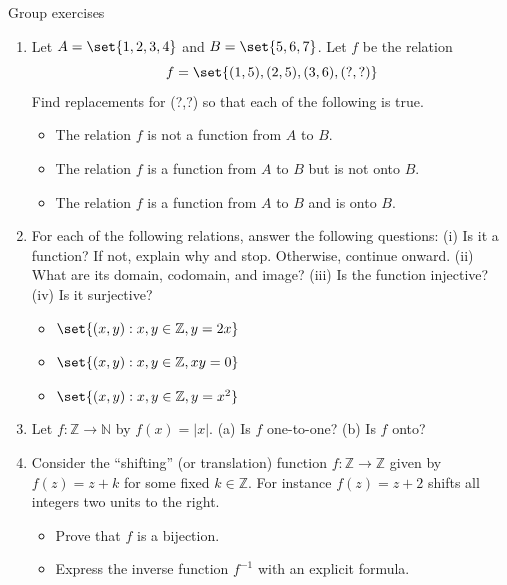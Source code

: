 \documentclass[10pt]{beamer}
\begin{document}
\begin{frame}{Group exercises}
\footnotesize 
\begin{enumerate}
	\item Let $A =\set{1,2,3,4}$ and $B=\set{5,6,7}$.  Let $f$ be the relation
	\[  f=\set{(1,5),(2,5), (3,6),(?,?)}\]
	Find replacements for (?,?) so that each of the following is true.
	\begin{itemize} \footnotesize 
		\item [a.] The relation $f$ is not a function from $A$ to $B$.
		\item [b.] The relation $f$ is a function from $A$ to $B$ but is not onto $B$.
		\item [c.] The relation $f$ is a function from $A$ to $B$ and is onto $B$.
	\end{itemize}
	\item For each of the following relations, answer the following questions:
	(i) Is it a function? If not, explain why and stop. Otherwise, continue onward.
	(ii) What are its domain, codomain, and image?
	(iii) Is the function injective? 
	(iv) Is it surjective?
	\begin{itemize}
	\item[a)] $\set{(x,y): x,y \in \mathbb{Z}, y=2x}$
	\item[b)] $\set{(x,y): x,y \in \mathbb{Z}, xy=0}$
	\item[c)] $\set{(x,y): x,y \in \mathbb{Z}, y=x^2}$
	\end{itemize}
	\item Let $f: \mathbb{Z} \to \mathbb{N}$ by $f(x)=|x|$.   (a) Is $f$ one-to-one? (b) Is $f$ onto?
	\item Consider the \enquote{shifting} (or translation) function $f: \mathbb{Z} \to \mathbb{Z}$ given by $f(z) = z+k$ for some fixed $k \in \mathbb{Z}$.  For instance $f(z) = z+2$ shifts all integers two units to the right.  
	\begin{itemize} \footnotesize 
		\item [a.] Prove that $f$ is a bijection.
		\item [b.] Express the inverse function $f^{-1}$ with an explicit formula.
	\end{itemize} 
\end{enumerate}
\end{frame}
\end{document}
